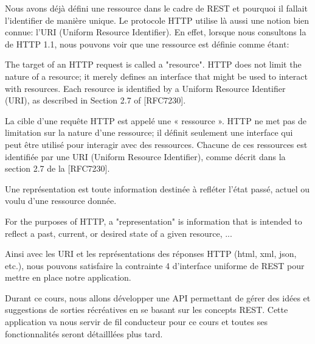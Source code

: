 \documentclass[big]{zmdocument}
\begin{document}
Nous avons déjà défini une ressource dans le cadre de REST et pourquoi il fallait l'identifier de manière unique.
Le protocole HTTP utilise là aussi une notion bien connue: l'URI (Uniform Resource Identifier). En effet, lorsque nous consultons la  de HTTP 1.1, nous pouvons voir que une ressource est définie comme étant:



\begin{Quotation}
The target of an HTTP request is called a "resource".  HTTP does not limit the nature of a resource; it merely defines an interface that might be used to interact with resources.  Each resource is identified by a Uniform Resource Identifier (URI), as described in Section 2.7 of [RFC7230].
\end{Quotation}



La cible d'une requête HTTP est appelé une « ressource ». HTTP ne met pas de limitation sur la nature d'une ressource; il définit seulement une interface qui peut être utilisé pour interagir avec des ressources.  Chacune de ces ressources est identifiée par une URI (Uniform Resource Identifier), comme décrit dans la section 2.7 de la [RFC7230].





Une représentation est toute information destinée à refléter l'état passé, actuel ou voulu d'une ressource donnée.



\begin{Quotation}
For the purposes of HTTP, a "representation" is information that is intended to reflect a past, current, or desired state of a given resource, ...
\end{Quotation}



Ainsi avec les URI et les représentations des réponses HTTP (html, xml, json, etc.), nous pouvons satisfaire la contrainte 4 d'interface uniforme de REST pour mettre en place notre application.







Durant ce cours, nous allons développer une API permettant de gérer des idées et suggestions de sorties récréatives en se basant sur les concepts REST. Cette application va nous servir de fil conducteur pour ce cours et toutes ses fonctionnalités seront détailllées plus tard.
\end{document}
